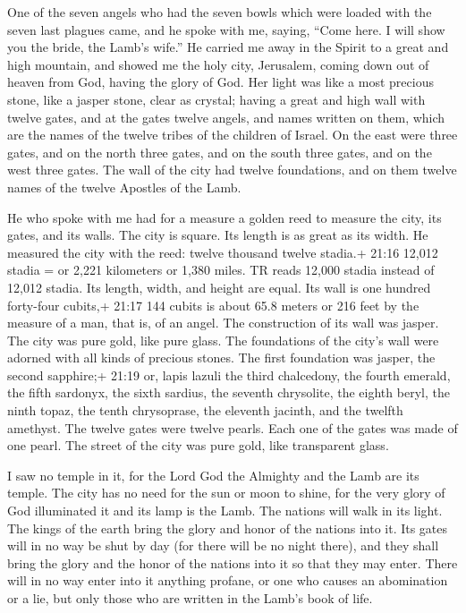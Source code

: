  One of the seven angels who had the seven bowls which were
loaded with the seven last plagues came, and he spoke with me, saying,
``Come here. I will show you the bride, the Lamb's wife.'' 
He carried me away in the Spirit to a great and high mountain, and
showed me the holy city, Jerusalem, coming down out of heaven from God,
 having the glory of God. Her light was like a most
precious stone, like a jasper stone, clear as crystal; 
having a great and high wall with twelve gates, and at the gates twelve
angels, and names written on them, which are the names of the twelve
tribes of the children of Israel.  On the east were three
gates, and on the north three gates, and on the south three gates, and
on the west three gates.  The wall of the city had twelve
foundations, and on them twelve names of the twelve Apostles of the
Lamb.

 He who spoke with me had for a measure a golden reed to
measure the city, its gates, and its walls.  The city is
square. Its length is as great as its width. He measured the city with
the reed: twelve thousand twelve stadia.+ 21:16 12,012 stadia = or 2,221
kilometers or 1,380 miles. TR reads 12,000 stadia instead of 12,012
stadia. Its length, width, and height are equal.  Its wall
is one hundred forty-four cubits,+ 21:17 144 cubits is about 65.8 meters
or 216 feet by the measure of a man, that is, of an angel. 
The construction of its wall was jasper. The city was pure gold, like
pure glass.  The foundations of the city's wall were
adorned with all kinds of precious stones. The first foundation was
jasper, the second sapphire;+ 21:19 or, lapis lazuli the third
chalcedony, the fourth emerald,  the fifth sardonyx, the
sixth sardius, the seventh chrysolite, the eighth beryl, the ninth
topaz, the tenth chrysoprase, the eleventh jacinth, and the twelfth
amethyst.  The twelve gates were twelve pearls. Each one of
the gates was made of one pearl. The street of the city was pure gold,
like transparent glass.

 I saw no temple in it, for the Lord God the Almighty and
the Lamb are its temple.  The city has no need for the sun
or moon to shine, for the very glory of God illuminated it and its lamp
is the Lamb.  The nations will walk in its light. The kings
of the earth bring the glory and honor of the nations into it.
 Its gates will in no way be shut by day (for there will be
no night there),  and they shall bring the glory and the
honor of the nations into it so that they may enter.  There
will in no way enter into it anything profane, or one who causes an
abomination or a lie, but only those who are written in the Lamb's book
of life.

